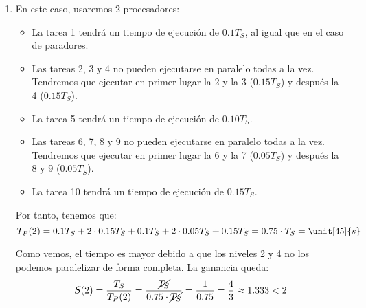 \begin{ejercicio}
\begin{enumerate}
        \item En este caso, usaremos 2 procesadores:
            \begin{itemize}
                \item La tarea 1 tendrá un tiempo de ejecución de $0.1T_S$, al igual que en el caso de paradores.
                \item Las tareas 2, 3 y 4 no pueden ejecutarse en paralelo todas a la vez. Tendremos que ejecutar en primer lugar la 2 y la 3 ($0.15T_S$) y después la 4 ($0.15T_S$).
                \item La tarea 5 tendrá un tiempo de ejecución de $0.10T_S$.
                \item Las tareas 6, 7, 8 y 9 no pueden ejecutarse en paralelo todas a la vez. Tendremos que ejecutar en primer lugar la 6 y la 7 ($0.05T_S$) y después la 8 y 9 ($0.05T_S$).
                \item La tarea 10 tendrá un tiempo de ejecución de $0.15T_S$.
            \end{itemize}

            Por tanto, tenemos que:
            \begin{equation*}
                T_P(2) = 0.1T_S + 2\cdot 0.15T_S + 0.1T_S + 2\cdot 0.05 T_S + 0.15 T_S = 0.75 \cdot T_S = \unit[45]{s}
            \end{equation*}

            Como vemos, el tiempo es mayor debido a que los niveles 2 y 4 no los podemos paralelizar de forma completa.
            La ganancia queda:
            \begin{equation*}
                S(2) = \dfrac{T_S}{T_P(2)} = \dfrac{\cancel{T_S}}{0.75\cdot \cancel{T_S}} = \frac{1}{0.75} = \frac{4}{3} \approx 1.333 < 2
            \end{equation*}
    \end{enumerate}
\end{ejercicio}


